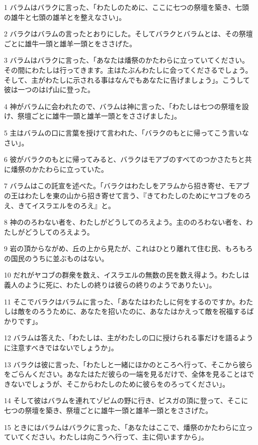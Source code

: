 \par 1 バラムはバラクに言った、「わたしのために、ここに七つの祭壇を築き、七頭の雄牛と七頭の雄羊とを整えなさい」。
\par 2 バラクはバラムの言ったとおりにした。そしてバラクとバラムとは、その祭壇ごとに雄牛一頭と雄羊一頭とをささげた。
\par 3 バラムはバラクに言った、「あなたは燔祭のかたわらに立っていてください。その間にわたしは行ってきます。主はたぶんわたしに会ってくださるでしょう。そして、主がわたしに示される事はなんでもあなたに告げましょう」。こうして彼は一つのはげ山に登った。
\par 4 神がバラムに会われたので、バラムは神に言った、「わたしは七つの祭壇を設け、祭壇ごとに雄牛一頭と雄羊一頭とをささげました」。
\par 5 主はバラムの口に言葉を授けて言われた、「バラクのもとに帰ってこう言いなさい」。
\par 6 彼がバラクのもとに帰ってみると、バラクはモアブのすべてのつかさたちと共に燔祭のかたわらに立っていた。
\par 7 バラムはこの託宣を述べた。「バラクはわたしをアラムから招き寄せ、モアブの王はわたしを東の山から招き寄せて言う、『きてわたしのためにヤコブをのろえ、きてイスラエルをのろえ』と。
\par 8 神ののろわない者を、わたしがどうしてのろえよう。主ののろわない者を、わたしがどうしてのろえよう。
\par 9 岩の頂からながめ、丘の上から見たが、これはひとり離れて住む民、もろもろの国民のうちに並ぶものはない。
\par 10 だれがヤコブの群衆を数え、イスラエルの無数の民を数え得よう。わたしは義人のように死に、わたしの終りは彼らの終りのようでありたい」。
\par 11 そこでバラクはバラムに言った、「あなたはわたしに何をするのですか。わたしは敵をのろうために、あなたを招いたのに、あなたはかえって敵を祝福するばかりです」。
\par 12 バラムは答えた、「わたしは、主がわたしの口に授けられる事だけを語るように注意すべきではないでしょうか」。
\par 13 バラクは彼に言った、「わたしと一緒にほかのところへ行って、そこから彼らをごらんください。あなたはただ彼らの一端を見るだけで、全体を見ることはできないでしょうが、そこからわたしのために彼らをのろってください」。
\par 14 そして彼はバラムを連れてゾピムの野に行き、ピスガの頂に登って、そこに七つの祭壇を築き、祭壇ごとに雄牛一頭と雄羊一頭とをささげた。
\par 15 ときにはバラムはバラクに言った、「あなたはここで、燔祭のかたわらに立っていてください。わたしは向こうへ行って、主に伺いますから」。
